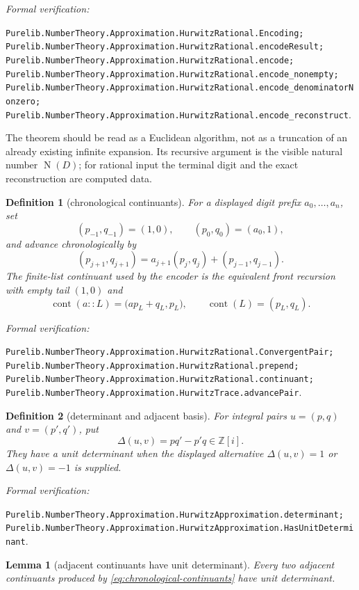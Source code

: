 \documentclass[11pt]{article}
\newtheorem{lemma}[lemma]{Lemma}
\newtheorem{definition}[definition]{Definition}
\newcommand{\Zi}{\mathbb{Z}[i]}
\newcommand{\Norm}[1]{\operatorname{N}\!\left(#1\right)}
\newcommand{\leanref}[1]{\par\smallskip\noindent
  \emph{Formal verification:}\par\nobreak
  {\raggedright\nolinkurl{#1}.\par}}
\begin{document}
\leanref{Purelib.NumberTheory.Approximation.HurwitzRational.Encoding;
Purelib.NumberTheory.Approximation.HurwitzRational.encodeResult;
Purelib.NumberTheory.Approximation.HurwitzRational.encode;
Purelib.NumberTheory.Approximation.HurwitzRational.encode_nonempty;
Purelib.NumberTheory.Approximation.HurwitzRational.encode_denominatorNonzero;
Purelib.NumberTheory.Approximation.HurwitzRational.encode_reconstruct}

The theorem should be read as a Euclidean algorithm, not as a truncation of
an already existing infinite expansion.  Its recursive argument is the
visible natural number $\Norm D$; for rational input the terminal digit and
the exact reconstruction are computed data.

\begin{definition}[chronological continuants]
\label{def:chronological-continuants}
For a displayed digit prefix $a_0,\ldots,a_n$, set
\[
 (p_{-1},q_{-1})=(1,0),\qquad (p_0,q_0)=(a_0,1),
\]
and advance chronologically by
\begin{equation}
\label{eq:chronological-continuants}
 (p_{j+1},q_{j+1})=
 a_{j+1}(p_j,q_j)+(p_{j-1},q_{j-1}).
\end{equation}
The finite-list continuant used by the encoder is the equivalent front
recursion with empty tail $(1,0)$ and
\[
           \operatorname{cont}(a::L)
            =\bigl(a p_L+q_L,p_L\bigr),
 \qquad \operatorname{cont}(L)=(p_L,q_L).
\]
\end{definition}

\leanref{Purelib.NumberTheory.Approximation.HurwitzRational.ConvergentPair;
Purelib.NumberTheory.Approximation.HurwitzRational.prepend;
Purelib.NumberTheory.Approximation.HurwitzRational.continuant;
Purelib.NumberTheory.Approximation.HurwitzTrace.advancePair}

\begin{definition}[determinant and adjacent basis]
\label{def:adjacent-basis}
For integral pairs $u=(p,q)$ and $v=(p',q')$, put
\[
                       \Delta(u,v)=pq'-p'q\in\Zi.
\]
They have a \emph{unit determinant} when the displayed alternative
$\Delta(u,v)=1$ or $\Delta(u,v)=-1$ is supplied.
\end{definition}

\leanref{Purelib.NumberTheory.Approximation.HurwitzApproximation.determinant;
Purelib.NumberTheory.Approximation.HurwitzApproximation.HasUnitDeterminant}

\begin{lemma}[adjacent continuants have unit determinant]
\label{lem:continuant-determinant}
Every two adjacent continuants produced by
\eqref{eq:chronological-continuants} have unit determinant.
\end{lemma}
\end{document}
